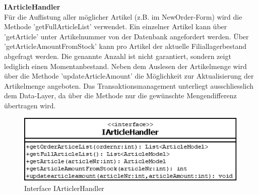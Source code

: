 \clearpage
\textbf{IArticleHandler}\\
Für die Auflistung aller möglicher Artikel (z.B. im NewOrder-Form) wird die Methode 'getFullArticleList' verwendet. Ein einzelner Artikel kann über 'getArticle' unter Artikelnummer von der Datenbank angefordert werden. Über 'getArticleAmountFromStock' kann pro Artikel der aktuelle Filiallagerbestand abgefragt werden. Die genannte Anzahl ist nicht garantiert, sondern zeigt lediglich einen Momentanbestand. Neben dem Auslesen der Artikelmenge wird über die Methode 'updateArticleAmount' die Möglichkeit zur Aktualisierung der Artikelmenge angeboten. Das Transaktionsmanagement unterliegt ausschliesslich dem Data-Layer, da über die Methode nur die gewünschte Mengendifferenz übertragen wird.
\begin{figure}[H]
	\includegraphics[width=0.6\linewidth]{Images/IArticleHandler}
	\caption{Interface IArticlerHandler}
	\label{fig:if-IArticleHandler}
\end{figure}

